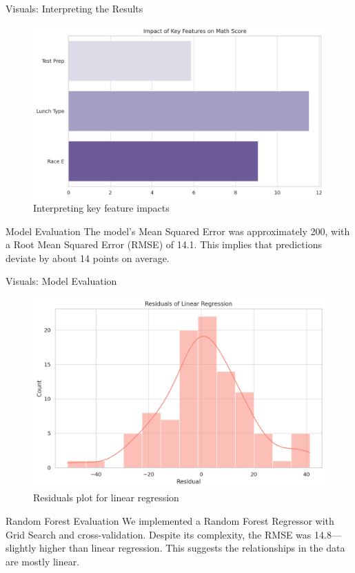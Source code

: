\documentclass{beamer}
\begin{document}
\begin{frame}{Visuals: Interpreting the Results}
  \begin{figure}
    \includegraphics[width=0.9\linewidth]{impact_summary_chart.png}
    \caption{Interpreting key feature impacts}
  \end{figure}
\end{frame}

\begin{frame}{Model Evaluation}
  The model's Mean Squared Error was approximately 200, with a Root Mean Squared Error (RMSE) of 14.1. This implies that predictions deviate by about 14 points on average.
\end{frame}

\begin{frame}{Visuals: Model Evaluation}
  \begin{figure}
    \includegraphics[width=0.9\linewidth]{residuals_plot.png}
    \caption{Residuals plot for linear regression}
  \end{figure}
\end{frame}

\begin{frame}{Random Forest Evaluation}
  We implemented a Random Forest Regressor with Grid Search and cross-validation. Despite its complexity, the RMSE was 14.8—slightly higher than linear regression. This suggests the relationships in the data are mostly linear.
\end{frame}
\end{document}
